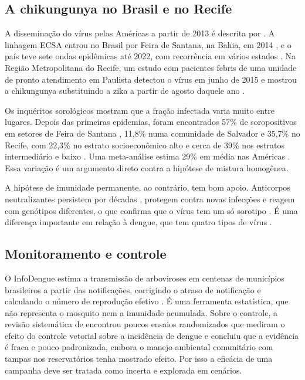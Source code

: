 \subsection{A chikungunya no Brasil e no Recife}

A disseminação do vírus pelas Américas a partir de 2013 é descrita por . A
linhagem ECSA entrou no Brasil por Feira de Santana, na Bahia, em 2014 \cite{faria2016}, e o país teve
sete ondas epidêmicas até 2022, com recorrência em vários estados \cite{desouza2023}. Na Região
Metropolitana do Recife, um estudo com pacientes febris de uma unidade de pronto atendimento em Paulista
detectou o vírus em junho de 2015 e mostrou a chikungunya substituindo a zika a partir de agosto daquele
ano \cite{magalhaes2017}.

Os inquéritos sorológicos mostram que a fração infectada varia muito entre lugares. Depois das primeiras
epidemias, foram encontrados 57\% de soropositivos em setores de Feira de Santana \cite{dias2018}, 11,8\%
numa comunidade de Salvador \cite{anjos2020} e 35,7\% no Recife, com 22,3\% no estrato socioeconômico alto e
cerca de 39\% nos estratos intermediário e baixo \cite{braga2023}. Uma meta-análise estima 29\% em média
nas Américas \cite{skalinski2023}. Essa variação é um argumento direto contra a hipótese de mistura
homogênea.

A hipótese de imunidade permanente, ao contrário, tem bom apoio. Anticorpos neutralizantes persistem por
décadas \cite{nitatpattana2014}, protegem contra novas infecções \cite{srikiatkhachorn2016} e reagem com
genótipos diferentes, o que confirma que o vírus tem um só sorotipo \cite{auerswald2018}. É uma diferença
importante em relação à dengue, que tem quatro tipos de vírus \cite{cdc2026}.

\subsection{Monitoramento e controle}

O InfoDengue estima a transmissão de arboviroses em centenas de municípios brasileiros a partir das
notificações, corrigindo o atraso de notificação e calculando o número de reprodução efetivo
\cite{codeco2018}. É uma ferramenta estatística, que não representa o mosquito nem a imunidade acumulada.
Sobre o controle, a revisão sistemática de  encontrou poucos ensaios randomizados
que mediram o efeito do controle vetorial sobre a incidência de dengue e concluiu que a evidência é fraca
e pouco padronizada, embora o manejo ambiental comunitário com tampas nos reservatórios tenha mostrado
efeito. Por isso a eficácia de uma campanha deve ser tratada como incerta e explorada em cenários.

